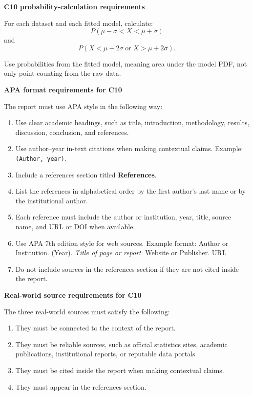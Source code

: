 \documentclass[12pt]{article}
\newcommand{\SubsectionBox}[1]{%
	\noindent\colorbox{gray!30}{%
		\parbox{\linewidth}{\textbf{#1}}%
	}\par\vspace{0.35cm}%
}
\begin{document}
	\SubsectionBox{C10 probability-calculation requirements}
	For each dataset and each fitted model, calculate:
	\[
	P(\mu-\sigma < X < \mu+\sigma)
	\]
	and
	\[
	P(X<\mu-2\sigma\;\text{or}\;X>\mu+2\sigma).
	\]
	
	Use probabilities from the fitted model, meaning area under the model PDF, not only point-counting from the raw data.
	
	\SubsectionBox{APA format requirements for C10}
	The report must use APA style in the following way:
	\begin{enumerate}
		\item Use clear academic headings, such as title, introduction, methodology, results, discussion, conclusion, and references.
		\item Use author--year in-text citations when making contextual claims. Example: \texttt{(Author, year)}.
		\item Include a references section titled \textbf{References}.
		\item List the references in alphabetical order by the first author's last name or by the institutional author.
		\item Each reference must include the author or institution, year, title, source name, and URL or DOI when available.
		\item Use APA 7th edition style for web sources. Example format: Author or Institution. (Year). \textit{Title of page or report}. Website or Publisher. URL
		\item Do not include sources in the references section if they are not cited inside the report.
	\end{enumerate}
	
	\SubsectionBox{Real-world source requirements for C10}
	The three real-world sources must satisfy the following:
	\begin{enumerate}
		\item They must be connected to the context of the report.
		\item They must be reliable sources, such as official statistics sites, academic publications, institutional reports, or reputable data portals.
		\item They must be cited inside the report when making contextual claims.
		\item They must appear in the references section.
	\end{enumerate}
	
\end{document}

